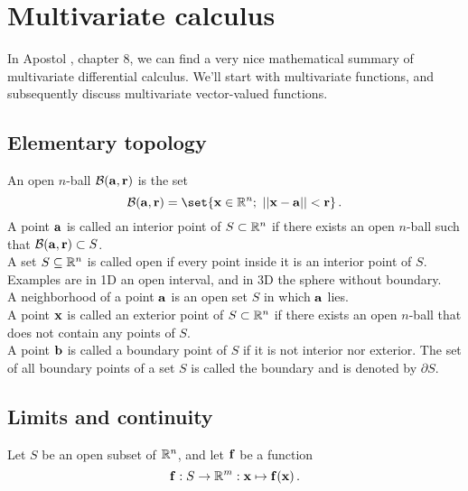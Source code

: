 \section{Multivariate calculus}
    In Apostol \cite{Apostol1969}, chapter 8, we can find a very nice mathematical summary of multivariate differential calculus. We'll start with multivariate functions, and subsequently discuss multivariate vector-valued functions.

    \subsection{Elementary topology}
        An open $n$-ball $\mathcal{B}(\vb{a}, \vb{r})$ is the set
        \begin{equation}
            \mathcal{B}(\vb{a}, \vb{r}) = \set{\vb{x} \in \R^n ; \thinspace \thinspace||\vb{x} - \vb{a}|| < \vb{r}} \thinspace .
        \end{equation}
        A point $\vb{a}$ is called an interior point of $S \subset \mathbb{R}^n$ if there exists an open $n$-ball such that \mbox{$\mathcal{B}(\vb{a}, \vb{r}) \subset S$}. \\

        A set $S \subseteq \mathbb{R}^n$ is called open if every point inside it is an interior point of $S$. Examples are in 1D an open interval, and in 3D the sphere without boundary. \\

        A neighborhood of a point $\vb{a}$ is an open set $S$ in which $\vb{a}$ lies. \\

        A point $\vb{x}$ is called an exterior point of $S \subset \mathbb{R}^n$ if there exists an open $n$-ball that does not contain any points of $S$. \\

        A point $\vb{b}$ is called a boundary point of $S$ if it is not interior nor exterior. The set of all boundary points of a set $S$ is called the boundary and is denoted by $\partial S$.

    \subsection{Limits and continuity}
        Let $S$ be an open subset of $\mathbb{R}^n$, and let $\vb{f}$ be a function
        \begin{equation}
            \vb{f}: S \rightarrow \mathbb{R}^m: \vb{x} \mapsto \vb{f}(\vb{x}) \thinspace .
        \end{equation}

